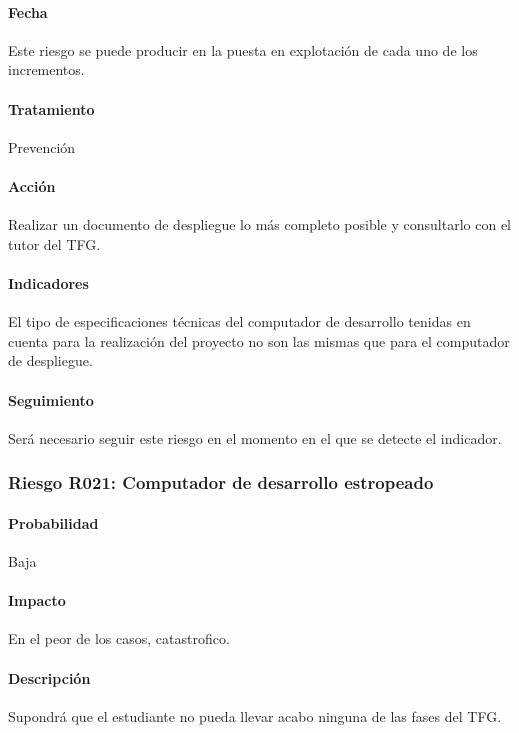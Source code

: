 \documentclass[10pt,a4paper]{article}
\begin{document}
				\paragraph{Fecha} Este riesgo se puede producir en la puesta en explotación de cada uno de los incrementos. %
				\paragraph{Tratamiento} Prevención %
				\paragraph{Acción} Realizar un documento de despliegue lo más completo posible y consultarlo con el tutor del TFG. %
				\paragraph{Indicadores} El tipo de  especificaciones técnicas del computador de desarrollo tenidas en cuenta para la realización del proyecto no son las mismas que para el computador de despliegue.  %
				\paragraph{Seguimiento}	Será necesario seguir este riesgo en el momento en el que se detecte el indicador.%
				
			\subsubsection{Riesgo R021: Computador de desarrollo estropeado }
				\paragraph{Probabilidad} Baja
				\paragraph{Impacto}	En el peor de los casos, catastrofico.
				\paragraph{Descripción} Supondrá que el estudiante no pueda llevar acabo ninguna de las fases del TFG.
\end{document}

